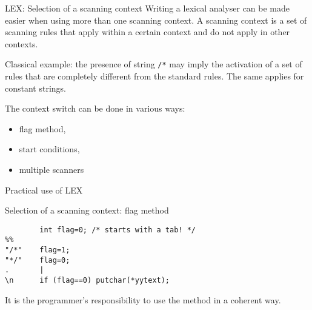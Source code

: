 \begin{frame}[fragile]{LEX: Selection of a scanning context}
Writing a lexical analyser can be made easier when using
more than one scanning context. A scanning context is a
set of scanning rules that apply within a certain context
and do not apply in other contexts.


\vspace{20pt}

Classical example: the presence of string
\verb"/*" may imply the activation of a set of rules that
are completely different from the standard rules. The
same applies for constant strings.


\vspace{20pt}

The context switch can be done in various ways:
\begin{itemize}
\item flag method, \item start conditions,
\item multiple scanners
\end{itemize}

\end{frame}
\begin{frame}[fragile]{Practical use of LEX}
\begin{center}{Selection of a scanning context: flag method}
\end{center}


\vspace{20pt}

\begin{verbatim}
        int flag=0; /* starts with a tab! */
%%
"/*"    flag=1;
"*/"    flag=0;
.       |
\n      if (flag==0) putchar(*yytext);
\end{verbatim}


\vspace{20pt}

It is the programmer's responsibility to use the method in a coherent way.

\end{frame}
